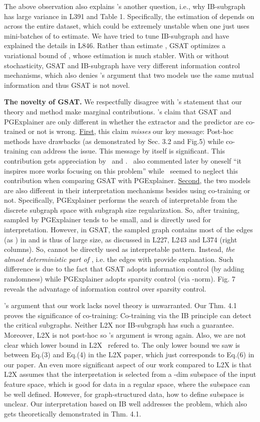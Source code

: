\documentclass{article}
\begin{document}
The above observation also explains \Rt's another question, i.e., why IB-subgraph has large variance in L391 and Table 1. Specifically, the estimation of  depends on  across the entire dataset, which could be extremely unstable when one just uses mini-batches of  to estimate. We have tried to tune IB-subgraph and have explained the details in L846. Rather than estimate , GSAT optimizes a variational bound of , whose estimation is much stabler. With or without stochasticity, GSAT and IB-subgraph have very different information control mechanisms, which also denies \Rf's argument that two models use the same mutual information and thus GSAT is not novel. 



\textbf{The novelty of GSAT.} We respectfully disagree with \Rf's statement that our theory and method make marginal contributions. \Rf's claim that GSAT and PGExplainer are only different in whether the extractor and the predictor are co-trained or not is wrong. \underline{First}, this claim \emph{misses} our key message: Post-hoc methods have drawbacks (as demonstrated by Sec. 3.2 and Fig.5) while co-training can address the issue. This message by itself is significant. This contribution gets  appreciation by \Rt~and \Rv. \Rf~also commented later by oneself ``it inspires more works focusing on this problem'' while \Rf~seemed to neglect this contribution when comparing GSAT with PGExplainer. \underline{Second}, the two models are also different in their interpretation mechanisms besides using co-training or not. Specifically, PGExplainer performs the search of interpretable  from the discrete subgraph space with subgraph size regularization. So, after training,  sampled by PGExplainer tends to be small, and is directly used for interpretation. However, in GSAT, the sampled graph  contains most of the edges (as ) in  and is thus of large size, as discussed in L227, L243 and L374 (right columns). So,  cannot be directly used as interpretable pattern. Instead, \emph{the almost deterministic part of }, i.e. the edges with  provide explanation. Such difference is due to the fact that GSAT adopts information control (by adding randomness) while PGExplainer adopts sparsity control (via -norm). Fig. 7 reveals the advantage of information control over sparsity control.

\Rf's argument that our work lacks novel theory is unwarranted. Our Thm. 4.1 proves the significance of co-training: Co-training via the IB principle can detect the critical subgraphs. Neither L2X nor IB-subgraph has such a guarantee. Moreover, L2X is not post-hoc so \Rf's argument is wrong again. Also, we are not clear which lower bound in L2X \Rf~refered to. The only lower bound we saw is between Eq.(3) and Eq.(4) in the L2X paper, which just corresponds to Eq.(6) in our paper. An even more significant aspect of our work compared to L2X is that L2X assumes that the interpretation is selected from a -dim subspace of the input feature space, which is good for data in a regular space, where the subspace can be well defined. However, for graph-structured data, how to define subspace is unclear. Our interpretation based on IB well addresses the problem, which also gets theoretically demonstrated in Thm. 4.1.   
\end{document}

